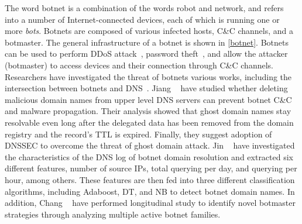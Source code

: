 \label{sec:Botnet}
\begin{table}[t]
\begin{center}
\small
\caption{Summary of the research works that have investigated detection of botnet domains. Here AR is Accuracy Rate, while LDR donates Low Deployment Rate of DNSSEC.}
\label{tab:SumBotnet}
\end{center}
\end{table}
The word botnet is a combination of the words robot and network, and refers into a number of Internet-connected devices, each of which is running one or more {\em bots}. Botnets are composed of various infected hosts, C\&C channels, and a botmaster. The general infrastructure of a botnet is shown in \autoref{botnet}. Botnets can be used to perform DDoS attack~, password theft~, and allow the attacker (botmaster) to access devices and their connection through C\&C channels. Researchers have investigated the threat of botnets various works, including the intersection between botnets and DNS~. 
Jiang \etal~ have studied whether deleting malicious domain names from upper level DNS servers can prevent botnet C\&C and malware propagation. Their analysis showed that ghost domain names stay resolvable even long after the delegated data has been removed from the domain registry and the record's TTL is expired. Finally, they suggest adoption of DNSSEC to overcome the threat of ghost domain attack. 
Jin \etal~ have investigated the characteristics of the DNS log of botnet domain resolution and extracted six different features, \eg number of source IPs, total querying per day, and querying per hour, among others. These features are then fed into three different classification algorithms, including Adaboost, DT, and NB to detect botnet domain names. In addition, Chang \etal~ have performed longitudinal study to identify novel botmaster strategies through analyzing multiple active botnet families. 
